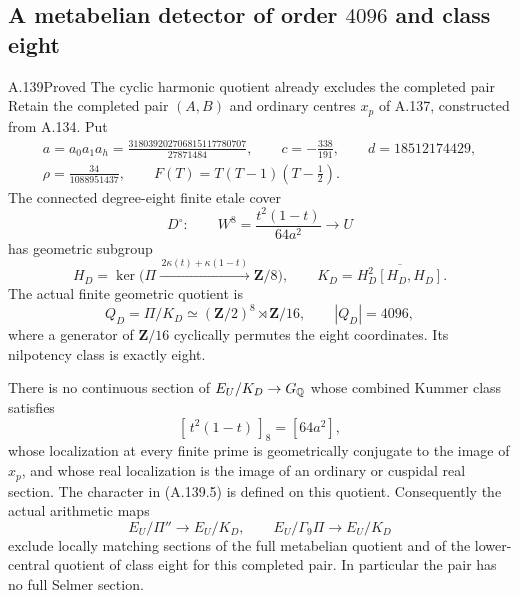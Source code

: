 \subsection{A metabelian detector of order \(4096\) and class eight}

\begin{statement}{A.139}{Proved}
{The cyclic harmonic quotient already excludes the completed pair}
Retain the completed pair \((A,B)\) and ordinary centres \(x_p\)
of A.137, constructed from A.134.  Put
\[
 \begin{gathered}
 a=a_0a_1a_h=\frac{318039202706815117780707}{27871484},\qquad
 c=-\frac{338}{191},\qquad d=18512174429,\\
 \rho=\frac{34}{1088951437},\qquad
 F(T)=T(T-1)(T-\tfrac12).
 \end{gathered}
\tag{A.139.1}
\]
The connected degree-eight finite etale cover
\[
 D^\circ:\qquad W^8=\frac{t^2(1-t)}{64a^2}
                  \longrightarrow U
\tag{A.139.2}
\]
has geometric subgroup
\[
 H_D=\ker\bigl(\Pi\xrightarrow{\,2\kappa(t)+\kappa(1-t)\,}
                         \mathbf Z/8\bigr),\qquad
 K_D=\overline{H_D^2[H_D,H_D]}.
\tag{A.139.3}
\]
The actual finite geometric quotient is
\[
 Q_D=\Pi/K_D
       \simeq (\mathbf Z/2)^8\rtimes\mathbf Z/16,\qquad |Q_D|=4096,
\tag{A.139.4}
\]
where a generator of \(\mathbf Z/16\) cyclically permutes the eight
coordinates.  Its nilpotency class is exactly eight.

There is no continuous section of \(E_U/K_D\to G_\mathbb Q\) whose combined
Kummer class satisfies
\[
                 [\,t^2(1-t)\,]_8=[64a^2],
\tag{A.139.5}
\]
whose localization at every finite prime is geometrically conjugate
to the image of \(x_p\), and whose real localization is the image of an
ordinary or cuspidal real section.  The character in (A.139.5) is
defined on this quotient.
Consequently the actual arithmetic maps
\[
       E_U/\Pi''\longrightarrow E_U/K_D,\qquad
       E_U/\Gamma_9\Pi\longrightarrow E_U/K_D
\tag{A.139.6}
\]
exclude locally matching sections of the full metabelian quotient
and of the lower-central quotient of class eight for this completed
pair.  In particular the pair has no full Selmer section.
\end{statement}

